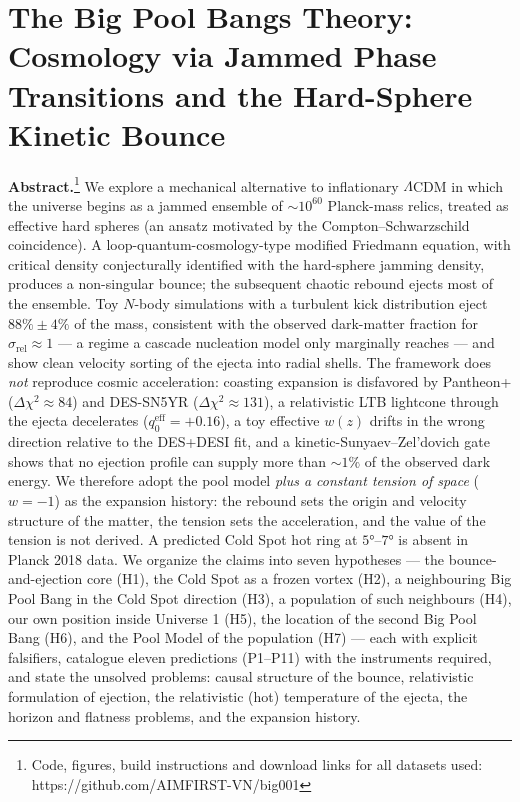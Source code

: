 \documentclass[
]{article}
\author{}
\date{}
\begin{document}
\hypertarget{the-big-pool-bangs-theory-cosmology-via-jammed-phase-transitions-and-the-hard-sphere-kinetic-bounce}{%
\section{\texorpdfstring{\textbf{The Big Pool Bangs Theory: Cosmology
via Jammed Phase Transitions and the Hard-Sphere Kinetic
Bounce}}{The Big Pool Bangs Theory: Cosmology via Jammed Phase Transitions and the Hard-Sphere Kinetic Bounce}}\label{the-big-pool-bangs-theory-cosmology-via-jammed-phase-transitions-and-the-hard-sphere-kinetic-bounce}}

\textbf{Abstract.}\footnote{Code, figures, build instructions and
  download links for all datasets used:
  https://github.com/AIMFIRST-VN/big001} We explore a mechanical
alternative to inflationary \(\Lambda\)CDM in which the universe begins
as a jammed ensemble of \(\sim\!10^{60}\) Planck-mass relics, treated as
effective hard spheres (an ansatz motivated by the
Compton--Schwarzschild coincidence). A loop-quantum-cosmology-type
modified Friedmann equation, with critical density conjecturally
identified with the hard-sphere jamming density, produces a non-singular
bounce; the subsequent chaotic rebound ejects most of the ensemble. Toy
\(N\)-body simulations with a turbulent kick distribution eject
\(88\% \pm 4\%\) of the mass, consistent with the observed dark-matter
fraction for \(\sigma_{\text{rel}} \approx 1\) --- a regime a cascade
nucleation model only marginally reaches --- and show clean velocity
sorting of the ejecta into radial shells. The framework does \emph{not}
reproduce cosmic acceleration: coasting expansion is disfavored by
Pantheon+ (\(\Delta\chi^2 \approx 84\)) and DES-SN5YR
(\(\Delta\chi^2 \approx 131\)), a relativistic LTB lightcone through the
ejecta decelerates (\(q_0^{\text{eff}} = +0.16\)), a toy effective
\(w(z)\) drifts in the wrong direction relative to the DES+DESI fit, and
a kinetic-Sunyaev--Zel'dovich gate shows that no ejection profile can
supply more than \(\sim\!1\%\) of the observed dark energy. We therefore
adopt the pool model \emph{plus a constant tension of space} (\(w=-1\))
as the expansion history: the rebound sets the origin and velocity
structure of the matter, the tension sets the acceleration, and the
value of the tension is not derived. A predicted Cold Spot hot ring at
\(5°\)--\(7°\) is absent in Planck 2018 data. We organize the claims
into seven hypotheses --- the bounce-and-ejection core (H1), the Cold
Spot as a frozen vortex (H2), a neighbouring Big Pool Bang in the Cold
Spot direction (H3), a population of such neighbours (H4), our own
position inside Universe 1 (H5), the location of the second Big Pool
Bang (H6), and the Pool Model of the population (H7) --- each with
explicit falsifiers, catalogue eleven predictions (P1--P11) with the
instruments required, and state the unsolved problems: causal structure
of the bounce, relativistic formulation of ejection, the relativistic
(hot) temperature of the ejecta, the horizon and flatness problems, and
the expansion history.
\end{document}
